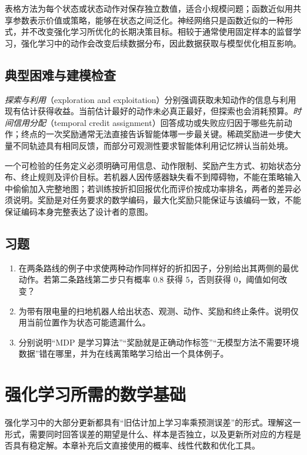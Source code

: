 \documentclass[UTF8,12pt,a4paper,fontset=fandol]{ctexbook}
\begin{document}
表格方法为每个状态或状态动作对保存独立数值，适合小规模问题；函数近似用共享参数表示价值或策略，能够在状态之间泛化。神经网络只是函数近似的一种形式，并不改变强化学习所优化的长期决策目标。相较于通常使用固定样本的监督学习，强化学习中的动作会改变后续数据分布，因此数据获取与模型优化相互影响。

\section{典型困难与建模检查}

\emph{探索与利用}（exploration and exploitation）分别强调获取未知动作的信息与利用现有估计获得收益。当前估计最好的动作未必真正最好，但探索也会消耗预算。\emph{时间信用分配}（temporal credit assignment）回答成功或失败应归因于哪些先前动作；终点的一次奖励通常无法直接告诉智能体哪一步最关键。稀疏奖励进一步使大量不同轨迹具有相同反馈，而部分可观测性要求智能体利用记忆辨认当前处境。

一个可检验的任务定义必须明确可用信息、动作限制、奖励产生方式、初始状态分布、终止规则及评价目标。若机器人因传感器缺失看不到障碍物，不能在策略输入中偷偷加入完整地图；若训练按折扣回报优化而评价按成功率排名，两者的差异必须说明。奖励是对任务要求的数学编码，最大化奖励只能保证与该编码一致，不能保证编码本身完整表达了设计者的意图。

\section{习题}
\begin{enumerate}
\item 在两条路线的例子中求使两种动作同样好的折扣因子，分别给出其两侧的最优动作。若第二条路线第二步只有概率 $0.8$ 获得 $5$，否则获得 $0$，阈值如何改变？
\item 为带有限电量的扫地机器人给出状态、观测、动作、奖励和终止条件。说明仅用当前位置作为状态可能遗漏什么。
\item 分别说明“MDP 是学习算法”“奖励就是正确动作标签”“无模型方法不需要环境数据”错在哪里，并为在线离策略学习给出一个具体例子。
\end{enumerate}

\chapter{强化学习所需的数学基础}
\label{ch:rl-math}

强化学习中的大部分更新都具有“旧估计加上学习率乘预测误差”的形式。理解这一形式，需要同时回答误差的期望是什么、样本是否独立，以及更新所对应的方程是否具有稳定解。本章补充后文直接使用的概率、线性代数和优化工具。
\end{document}
